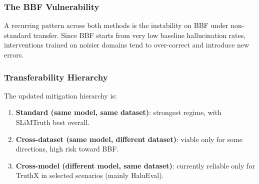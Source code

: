 \subsubsection{The BBF Vulnerability}
A recurring pattern across both methods is the instability on BBF under non-standard transfer. Since BBF starts from very low baseline hallucination rates, interventions trained on noisier domains tend to over-correct and introduce new errors.

\subsubsection{Transferability Hierarchy}
The updated mitigation hierarchy is:
\begin{enumerate}
    \item \textbf{Standard (same model, same dataset)}: strongest regime, with SLiMTruth best overall.
    \item \textbf{Cross-dataset (same model, different dataset)}: viable only for some directions, high risk toward BBF.
    \item \textbf{Cross-model (different model, same dataset)}: currently reliable only for TruthX in selected scenarios (mainly HaluEval).
\end{enumerate}

